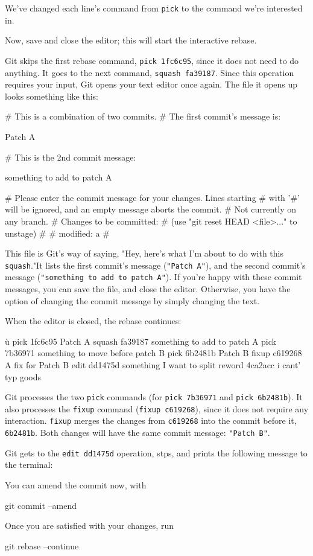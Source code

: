 We've changed each line's command from \texttt{pick} to the command we're interested in.

Now, save and close the editor; this will start the interactive rebase. 

Git skips the first rebase command, \texttt{pick 1fc6c95}, since it does not need to do anything. It goes to the next command, \texttt{squash fa39187}. Since this operation requires your input, Git opens your text editor once again. The file it opens up looks something like this:
\begin{codeblock}[language=bash]
# This is a combination of two commits.
# The first commit's message is:

Patch A

# This is the 2nd commit message:

something to add to patch A

# Please enter the commit message for your changes. Lines starting
# with '#' will be ignored, and an empty message aborts the commit.
# Not currently on any branch.
# Changes to be committed:
#   (use "git reset HEAD <file>..." to unstage)
#
# modified:   a
#
\end{codeblock}

This file is Git's way of saying, "Hey, here's what I'm about to do with this \texttt{squash}."It lists the first commit's message (\texttt{"Patch A"}), and the second commit's message (\texttt{"something to add to patch A"}). If you're happy with these commit messages, you can save the file, and close the editor. Otherwise, you have the option of changing the commit message by simply changing the text.

When the editor is closed, the rebase continues:
\begin{codeblock}[language=bash]ù
pick 1fc6c95 Patch A
squash fa39187 something to add to patch A
pick 7b36971 something to move before patch B
pick 6b2481b Patch B
fixup c619268 A fix for Patch B
edit dd1475d something I want to split
reword 4ca2acc i cant' typ goods
\end{codeblock}

Git processes the two \texttt{pick} commands (for \texttt{pick 7b36971} and \texttt{pick 6b2481b}). It also processes the \texttt{fixup} command (\texttt{fixup c619268}), since it does not require any interaction. \texttt{fixup} merges the changes from \texttt{c619268} into the commit before it, \texttt{6b2481b}. Both changes will have the same commit message: \texttt{"Patch B"}.

Git gets to the \texttt{edit dd1475d} operation, stps, and prints the following message to the terminal:
\begin{codeblock}[language=bash]
You can amend the commit now, with

    git commit --amend

Once you are satisfied with your changes, run

    git rebase --continue    
\end{codeblock}

